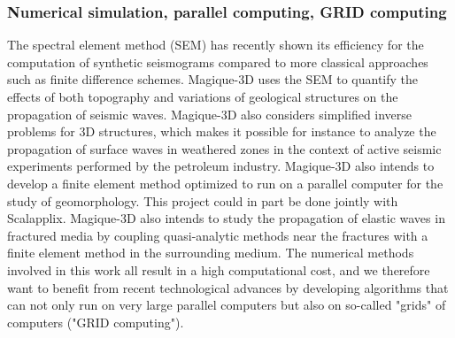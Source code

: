 \subsubsection{Numerical simulation, parallel computing, GRID computing}

    The spectral element method (SEM) has recently shown its efficiency for the computation of synthetic seismograms compared to more classical approaches such as finite difference schemes. Magique-3D uses the SEM to quantify the effects of both topography and variations of geological structures on the propagation of seismic waves. Magique-3D also considers simplified inverse problems for 3D structures, which makes it possible for instance to analyze the propagation of surface waves in weathered zones in the context of active seismic experiments performed by the petroleum industry. Magique-3D also intends to develop a finite element method optimized to run on a parallel computer for the study of geomorphology. This project could in part be done jointly with Scalapplix. Magique-3D also intends to study the propagation of elastic waves in fractured media by coupling quasi-analytic methods near the fractures with a finite element method in the surrounding medium. The numerical methods involved in this work all result in a high computational cost, and we therefore want to benefit from recent technological advances by developing algorithms that can not only run on very large parallel computers but also on so-called "grids" of computers ("GRID computing").
